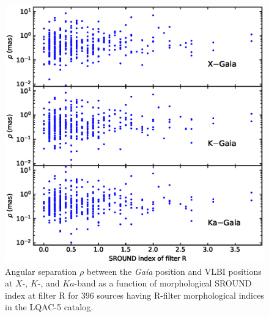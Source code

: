 \documentclass{aa-note}   %
\begin{document}
\begin{figure}[hbtp]
    \centering
    \includegraphics[width=\columnwidth]{figs/rho-I2R}
    \caption[]{\label{fig:rho-I2R}
        Angular separation $\rho$ between the {\it Gaia} position and VLBI positions at $X$-, $K$-, and $Ka$-band as a function of morphological SROUND index at filter R for 396 sources having R-filter morphological indices in the LQAC-5 catalog.
    }
\end{figure}
\end{document}
